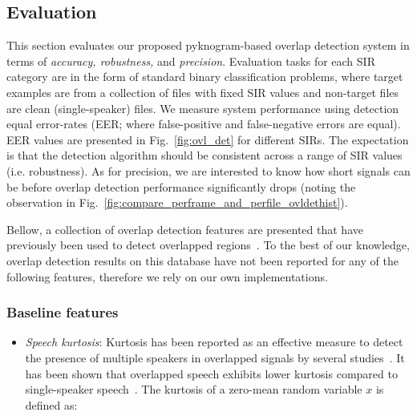 {\newpage

\subsection{Evaluation}
\label{sec:exp}

This section evaluates our proposed pyknogram-based overlap detection system in terms of {\it accuracy, robustness,} and {\it precision}. 
Evaluation tasks for each SIR category are in the form of standard binary classification problems, where target examples are from a collection of files with fixed SIR values and non-target files are clean (single-speaker) files. 
We measure system performance using detection equal error-rates (EER; where false-positive and false-negative errors are equal). 
EER values are presented in Fig.~\ref{fig:ovl_det} for different SIRs. 
The expectation is that the detection algorithm should be consistent across a range of SIR values (i.e. robustness). 
As for precision, we are interested to know how short signals can be before overlap detection performance significantly drops (noting the observation in Fig.~\ref{fig:compare_perframe_and_perfile_ovldethist}). 


Bellow, a collection of overlap detection features are presented that have previously been used to detect overlapped regions~\cite{nav_icassp13,boakye_thesis,sapvr_2000}. 
To the best of our knowledge, overlap detection results on this database have not been reported for any of the following features, therefore we rely on our own implementations. %


\subsubsection{Baseline features}

\label{ssec:baseline}
\begin{itemize}
  \item {\it Speech kurtosis}: Kurtosis has been reported as an effective measure to detect the presence of multiple speakers in overlapped signals by several studies~\cite{Wrigley_05,boakye_thesis,temple_kurtosis}. 
  It has been shown that overlapped speech exhibits lower kurtosis compared to single-speaker speech~\cite{leblanc_deleon98}. The kurtosis of a zero-mean random variable $x$ is defined as:


\end{itemize}}
